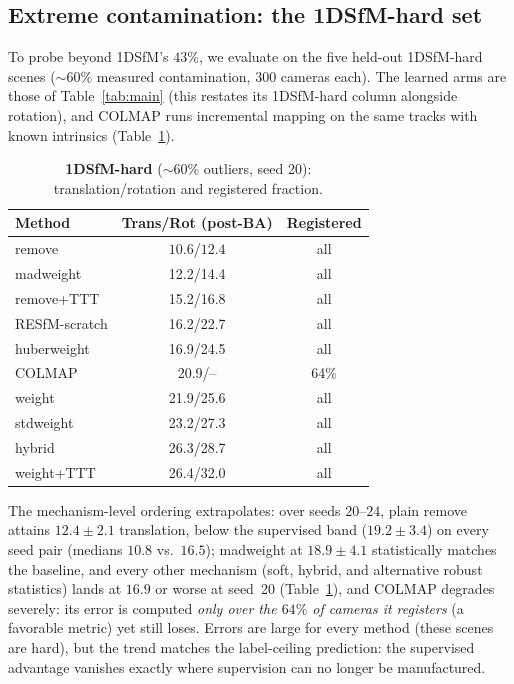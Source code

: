 \documentclass{article}
\newcommand{\mad}{madweight}
\begin{document}
\subsection{Extreme contamination: the 1DSfM-hard set}\label{sec:extreme}
To probe beyond 1DSfM's $43\%$, we evaluate on the five held-out 1DSfM-hard scenes
($\sim\!60\%$ measured contamination, $300$ cameras each). The learned arms are those of
Table~\ref{tab:main} (this restates its 1DSfM-hard column alongside rotation), and
COLMAP runs incremental mapping on the same tracks with known intrinsics
(Table~\ref{tab:hard}).
\begin{table}[t]\centering\small
\caption{\textbf{1DSfM-hard} ($\sim\!60\%$ outliers, seed 20): translation/rotation
and registered fraction.}
\label{tab:hard}
\begin{tabular}{lcc}
\toprule
Method & Trans/Rot (post-BA) & Registered\\
\midrule
remove & $\mathbf{10.6}$/$\mathbf{12.4}$ & all\\
\mad{} & 12.2/14.4 & all\\
remove+TTT & 15.2/16.8 & all\\
RESfM-scratch              & 16.2/22.7 & all\\
huberweight & 16.9/24.5 & all\\
COLMAP                     & 20.9/--   & 64\%\\
weight & 21.9/25.6 & all\\
stdweight & 23.2/27.3 & all\\
hybrid & 26.3/28.7 & all\\
weight+TTT & 26.4/32.0 & all\\
\bottomrule
\end{tabular}
\end{table}
The mechanism-level ordering extrapolates: over seeds $20$--$24$, plain remove attains
$12.4\pm2.1$ translation, below the supervised band ($19.2\pm3.4$) on every seed pair
(medians $10.8$ vs.\ $16.5$); \mad{} at $18.9\pm4.1$ statistically matches the
baseline, and every other mechanism (soft, hybrid, and alternative robust
statistics) lands at $16.9$ or worse at seed~20 (Table~\ref{tab:hard}), and COLMAP degrades severely: its error is computed
\emph{only over the $64\%$ of cameras it registers} (a favorable metric) yet still loses.
Errors are large for every method (these scenes are hard), but the trend matches the
label-ceiling prediction: the supervised advantage vanishes exactly where supervision can
no longer be manufactured.
\end{document}
